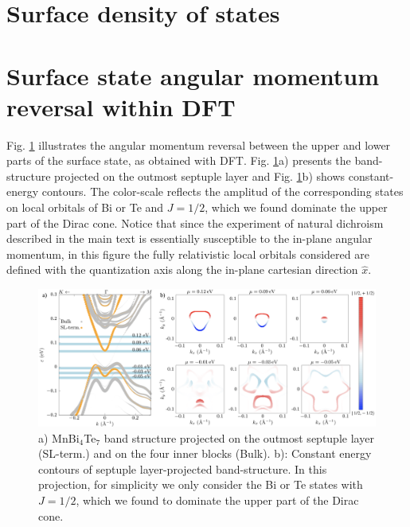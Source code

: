 \documentclass[showpacs, preprintnumbers, pra, superscriptaddress, floatfix, onecolumn, longbibliography]{revtex4-1}
\begin{document}
\section{Surface density of states}



\section{Surface state angular momentum reversal within DFT}
Fig. \ref{dft_sl} illustrates the angular momentum reversal between the upper and lower parts of the surface state, as obtained with DFT. 
Fig. \ref{dft_sl}a) presents the band-structure projected on the outmost septuple layer and Fig. \ref{dft_sl}b) shows constant-energy contours. The color-scale reflects the amplitud of the corresponding states on local orbitals of Bi or Te and $J=1/2$, which we found dominate the upper part of the Dirac cone.
Notice that since the experiment of natural dichroism described in the main text is essentially susceptible to the in-plane angular momentum, in this figure the fully relativistic local orbitals considered are defined with the quantization axis along the in-plane cartesian direction $\hat{x}$.
\begin{figure}[h!]
 \centering
 \includegraphics[width=18 cm]{sl.png}
	\caption{a) MnBi$_4$Te$_7$ band structure projected on the outmost septuple layer (SL-term.) and on the four inner blocks (Bulk). 
	b): Constant energy contours of septuple layer-projected band-structure. In this projection, for simplicity we only consider the Bi or Te states with $J=1/2$, which we found to dominate the upper part of the Dirac cone.
	}
	\label{dft_sl}
\end{figure}



\end{document}
